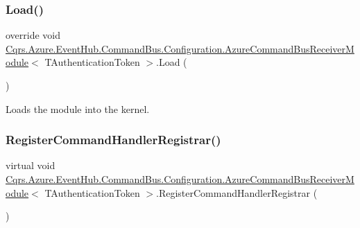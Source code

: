 \subsubsection{\texorpdfstring{Load()}{Load()}}
{\footnotesize\ttfamily override void \hyperlink{classCqrs_1_1Azure_1_1EventHub_1_1CommandBus_1_1Configuration_1_1AzureCommandBusReceiverModule}{Cqrs.\+Azure.\+Event\+Hub.\+Command\+Bus.\+Configuration.\+Azure\+Command\+Bus\+Receiver\+Module}$<$ T\+Authentication\+Token $>$.Load (\begin{DoxyParamCaption}{ }\end{DoxyParamCaption})}



Loads the module into the kernel. 

\mbox{\label{classCqrs_1_1Azure_1_1EventHub_1_1CommandBus_1_1Configuration_1_1AzureCommandBusReceiverModule_a62975fe00dd6c7f62b5eba6bb6eed7c4_a62975fe00dd6c7f62b5eba6bb6eed7c4}} 
\subsubsection{\texorpdfstring{Register\+Command\+Handler\+Registrar()}{RegisterCommandHandlerRegistrar()}}
{\footnotesize\ttfamily virtual void \hyperlink{classCqrs_1_1Azure_1_1EventHub_1_1CommandBus_1_1Configuration_1_1AzureCommandBusReceiverModule}{Cqrs.\+Azure.\+Event\+Hub.\+Command\+Bus.\+Configuration.\+Azure\+Command\+Bus\+Receiver\+Module}$<$ T\+Authentication\+Token $>$.Register\+Command\+Handler\+Registrar (\begin{DoxyParamCaption}{ }\end{DoxyParamCaption})\hspace{0.3cm}{\ttfamily [virtual]}}



